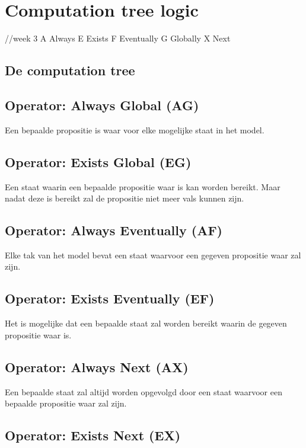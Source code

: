 \documentclass{article}
\begin{document}
\section{Computation tree logic}
//week 3
A Always E Exists F Eventually G Globally X Next

\subsection{De computation tree}

\subsection{Operator: Always Global (AG)}

Een bepaalde propositie is waar voor elke mogelijke staat in het model.

\subsection{Operator: Exists Global (EG)}

Een staat waarin een bepaalde propositie waar is kan worden bereikt. Maar nadat deze is bereikt zal de propositie niet meer vals kunnen zijn.

\subsection{Operator: Always Eventually (AF)}

Elke tak van het model bevat een staat waarvoor een gegeven propositie waar zal zijn.

\subsection{Operator: Exists Eventually (EF)}

Het is mogelijke dat een bepaalde staat zal worden bereikt waarin de gegeven propositie waar is.

\subsection{Operator: Always Next (AX)}

Een bepaalde staat zal altijd worden opgevolgd door een staat waarvoor een bepaalde propositie waar zal zijn.

\subsection{Operator: Exists Next (EX)}
\end{document}
